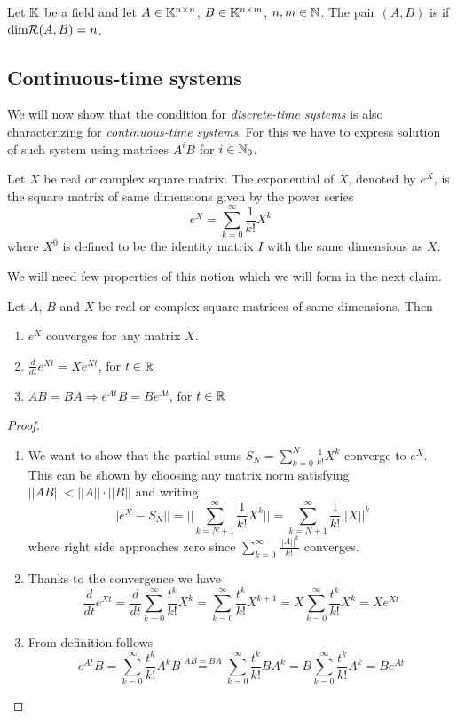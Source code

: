 \begin{definition}
	Let $\mathbb{K}$ be a field and let $A \in \mathbb{K}^{n \times n}$, $B \in \mathbb{K}^{n \times m}$, $n,m \in \mathbb{N}$. The pair $(A,B)$ is  if $\textnormal{dim}\mathcal{R}(A,B)=n$.
\end{definition}

\subsection{Continuous-time systems}

We will now show that the condition for \textit{discrete-time systems} is also characterizing for \textit{continuous-time systems}. For this we have to express solution of such system using matrices $A^iB$ for $i\in \mathbb{N}_0$. 

\begin{definition}
	Let $X$ be real or complex square matrix. The exponential of $X$, denoted by $e^X$, is the square matrix of same dimensions given by the power series $$e^{X}=\sum _{k=0}^{\infty}\frac{1}{k!}X^{k}$$
	where $X^0$ is defined to be the identity matrix $I$ with the same dimensions as $X$.
\end{definition}

We will need few properties of this notion which we will form in the next claim. 

\begin{remark}
	Let $A$, $B$ and $X$ be real or complex square matrices of same dimensions. Then 
	\begin{enumerate}
		\item $e^X$ converges for any matrix $X$.
		\item $\frac{d}{dt}e^{Xt}=Xe^{Xt}$, for $t \in \mathbb{R}$
		\item $AB = BA \Rightarrow e^{At}B = Be^{At}$, for $t \in \mathbb{R}$
	\end{enumerate}
\end{remark}

\begin{proof}
	\begin{enumerate}
		\item We want to show that the partial sums $S_N=\sum^N_{k=0}\frac{1}{k!}X^k$ converge to $e^X$. This can be shown by choosing any matrix norm satisfying $||AB||<||A||\cdot||B||$ and writing $$||e^X-S_N||=||\sum^\infty_{k=N+1}\frac{1}{k!}X^k||=\sum^\infty_{k=N+1}\frac{1}{k!}||X||^k$$ where right side approaches zero since $\sum^\infty_{k=0}\frac{||A||^k}{k!}$ converges.

		\item Thanks to the convergence we have $$\frac{d}{dt}e^{Xt}=\frac{d}{dt}\sum^\infty_{k=0}\frac{t^k}{k!}X^{k}=\sum^\infty_{k=0}\frac{t^k}{k!}X^{k+1}=X\sum^\infty_{k=0}\frac{t^k}{k!}X^{k}=Xe^{Xt}$$

		\item From definition follows $$e^{At}B=\sum^\infty_{k=0}\frac{t^k}{k!}A^{k}B\stackrel{AB=BA}{=}\sum^\infty_{k=0}\frac{t^k}{k!}BA^{k}=B\sum^\infty_{k=0}\frac{t^k}{k!}A^{k}=Be^{At}$$ 
	\end{enumerate}
\end{proof}

